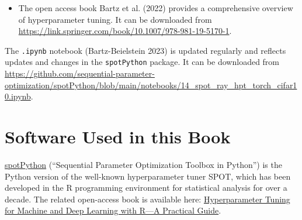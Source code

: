 \documentclass[
  letterpaper,
  DIV=11,
  numbers=noendperiod]{scrreprt}
\providecommand{\tightlist}{%
  \setlength{\itemsep}{0pt}\setlength{\parskip}{0pt}}\usepackage{longtable,booktabs,array}
\begin{document}
\begin{tcolorbox}[enhanced jigsaw, left=2mm, title=\textcolor{quarto-callout-tip-color}{\faLightbulb}\hspace{0.5em}{Hyperparameter Tuning Reference}, titlerule=0mm, toprule=.15mm, leftrule=.75mm, colbacktitle=quarto-callout-tip-color!10!white, colback=white, arc=.35mm, toptitle=1mm, bottomtitle=1mm, colframe=quarto-callout-tip-color-frame, bottomrule=.15mm, rightrule=.15mm, breakable, coltitle=black, opacitybacktitle=0.6, opacityback=0]

\begin{itemize}
\tightlist
\item
  The open access book Bartz et al. (2022) provides a comprehensive
  overview of hyperparameter tuning. It can be downloaded from
  \url{https://link.springer.com/book/10.1007/978-981-19-5170-1}.
\end{itemize}

\end{tcolorbox}

\begin{tcolorbox}[enhanced jigsaw, left=2mm, title=\textcolor{quarto-callout-note-color}{\faInfo}\hspace{0.5em}{Note}, titlerule=0mm, toprule=.15mm, leftrule=.75mm, colbacktitle=quarto-callout-note-color!10!white, colback=white, arc=.35mm, toptitle=1mm, bottomtitle=1mm, colframe=quarto-callout-note-color-frame, bottomrule=.15mm, rightrule=.15mm, breakable, coltitle=black, opacitybacktitle=0.6, opacityback=0]

The \texttt{.ipynb} notebook (Bartz-Beielstein 2023) is updated
regularly and reflects updates and changes in the \texttt{spotPython}
package. It can be downloaded from
\url{https://github.com/sequential-parameter-optimization/spotPython/blob/main/notebooks/14_spot_ray_hpt_torch_cifar10.ipynb}.

\end{tcolorbox}

\hypertarget{software-used-in-this-book}{%
\section*{Software Used in this Book}\label{software-used-in-this-book}}


\href{https://github.com/sequential-parameter-optimization/spotPython}{spotPython}
(``Sequential Parameter Optimization Toolbox in Python'') is the Python
version of the well-known hyperparameter tuner SPOT, which has been
developed in the R programming environment for statistical analysis for
over a decade. The related open-access book is available here:
\href{https://link.springer.com/book/10.1007/978-981-19-5170-1}{Hyperparameter
Tuning for Machine and Deep Learning with R---A Practical Guide}.
\end{document}
